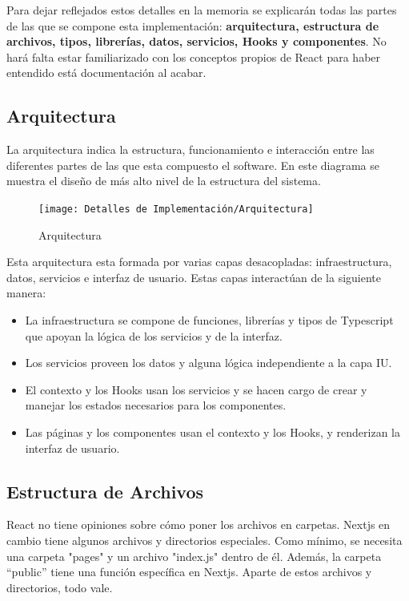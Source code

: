 \documentclass[12pt,twoside,titlepage]{report}
\begin{document}
Para dejar reflejados estos detalles en la memoria se explicarán todas las partes de las que se compone esta implementación: \textbf{arquitectura, estructura de archivos, tipos, librerías, datos, servicios, Hooks y componentes}. No hará falta estar familiarizado con los conceptos propios de React para haber entendido está documentación al acabar.

\subsection{Arquitectura}

La arquitectura indica la estructura, funcionamiento e interacción entre las diferentes partes de las que esta compuesto el software. En este diagrama se muestra el diseño de más alto nivel de la estructura del sistema.

\begin{figure}[H]
    \centering
    \texttt{[image: Detalles de Implementación/Arquitectura]}
    \label{fig:Arquitectura}
    \caption{Arquitectura}
\end{figure}

Esta arquitectura esta formada por varias capas desacopladas: infraestructura, datos, servicios e interfaz de usuario. Estas capas interactúan de la siguiente manera:

\begin{itemize}
    \item La infraestructura se compone de funciones, librerías y tipos de Typescript que apoyan la lógica de los servicios y de la interfaz.
    \item Los servicios proveen los datos y alguna lógica independiente a la capa IU.
    \item El contexto y los Hooks usan los servicios y se hacen cargo de crear y manejar los estados necesarios para los componentes.
    \item Las páginas y los componentes usan el contexto y los Hooks, y renderizan la interfaz de usuario.
\end{itemize}

\subsection{Estructura de Archivos}

React no tiene opiniones sobre cómo poner los archivos en carpetas. Nextjs en cambio tiene algunos archivos y directorios especiales. Como mínimo, se necesita una carpeta "pages" y un archivo "index.js" dentro de él. Además, la carpeta “public” tiene una función específica en Nextjs. Aparte de estos archivos y directorios, todo vale.
\end{document}
